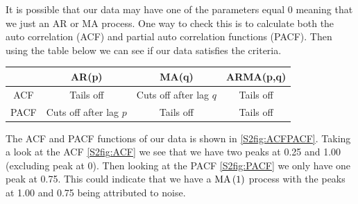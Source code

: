 It is possible that our data may have one of the parameters equal 0 meaning that we just an AR or MA process. One way to check this is to calculate both the auto correlation (ACF) and partial auto correlation functions (PACF). Then using the table below we can see if our data satisfies the criteria.
\par\medskip
\begin{center}
    \begin{tabular}{c|c|c|c}
        & AR(p) & MA(q) & ARMA(p,q) \\
        \hline ACF & Tails off & Cuts off after lag $q$ & Tails off \\
        PACF & Cuts off after lag $p$ & Tails off & Tails off \\
    \end{tabular}
\end{center}
\par\medskip
The ACF and PACF functions of our data is shown in \autoref{S2fig:ACFPACF}. Taking a look at the ACF \autoref{S2fig:ACF} we see that we have two peaks at 0.25 and 1.00 (excluding peak at 0). Then looking at the PACF \autoref{S2fig:PACF} we only have one peak at 0.75. This could indicate that we have a $\text{MA}\left(1\right)$ process with the peaks at 1.00 and 0.75 being attributed to noise.

